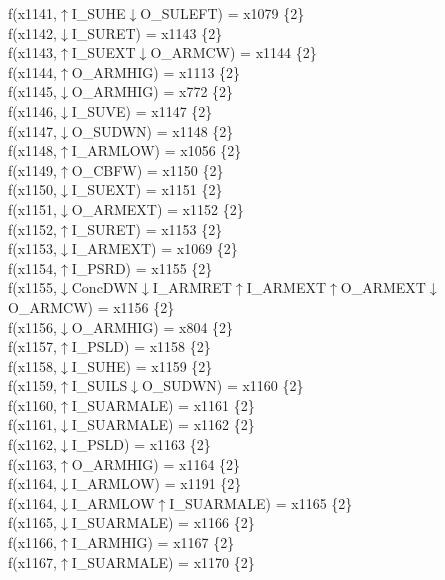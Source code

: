 f(x1141,$\uparrow$I\_SUHE$\downarrow$O\_SULEFT) = x1079 \{2\} \\  
f(x1142,$\downarrow$I\_SURET) = x1143 \{2\} \\  
f(x1143,$\uparrow$I\_SUEXT$\downarrow$O\_ARMCW) = x1144 \{2\} \\  
f(x1144,$\uparrow$O\_ARMHIG) = x1113 \{2\} \\  
f(x1145,$\downarrow$O\_ARMHIG) = x772 \{2\} \\  
f(x1146,$\downarrow$I\_SUVE) = x1147 \{2\} \\  
f(x1147,$\downarrow$O\_SUDWN) = x1148 \{2\} \\  
f(x1148,$\uparrow$I\_ARMLOW) = x1056 \{2\} \\  
f(x1149,$\uparrow$O\_CBFW) = x1150 \{2\} \\  
f(x1150,$\downarrow$I\_SUEXT) = x1151 \{2\} \\  
f(x1151,$\downarrow$O\_ARMEXT) = x1152 \{2\} \\  
f(x1152,$\uparrow$I\_SURET) = x1153 \{2\} \\  
f(x1153,$\downarrow$I\_ARMEXT) = x1069 \{2\} \\  
f(x1154,$\uparrow$I\_PSRD) = x1155 \{2\} \\  
f(x1155,$\downarrow$ConcDWN$\downarrow$I\_ARMRET$\uparrow$I\_ARMEXT$\uparrow$O\_ARMEXT$\downarrow$O\_ARMCW) = x1156 \{2\} \\  
f(x1156,$\downarrow$O\_ARMHIG) = x804 \{2\} \\  
f(x1157,$\uparrow$I\_PSLD) = x1158 \{2\} \\  
f(x1158,$\downarrow$I\_SUHE) = x1159 \{2\} \\  
f(x1159,$\uparrow$I\_SUILS$\downarrow$O\_SUDWN) = x1160 \{2\} \\  
f(x1160,$\uparrow$I\_SUARMALE) = x1161 \{2\} \\  
f(x1161,$\downarrow$I\_SUARMALE) = x1162 \{2\} \\  
f(x1162,$\downarrow$I\_PSLD) = x1163 \{2\} \\  
f(x1163,$\uparrow$O\_ARMHIG) = x1164 \{2\} \\  
f(x1164,$\downarrow$I\_ARMLOW) = x1191 \{2\} \\  
f(x1164,$\downarrow$I\_ARMLOW$\uparrow$I\_SUARMALE) = x1165 \{2\} \\  
f(x1165,$\downarrow$I\_SUARMALE) = x1166 \{2\} \\  
f(x1166,$\uparrow$I\_ARMHIG) = x1167 \{2\} \\  
f(x1167,$\uparrow$I\_SUARMALE) = x1170 \{2\} \\  
